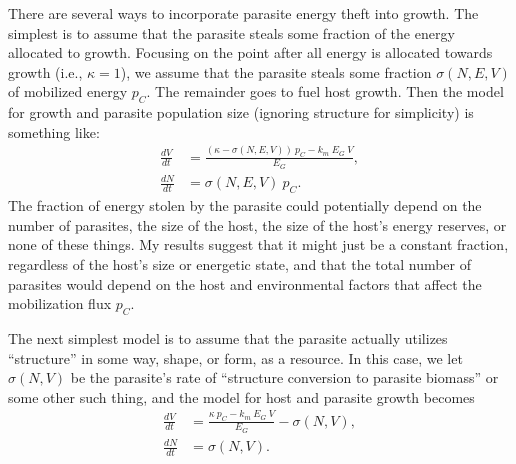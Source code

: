 \documentclass[11pt,reqno,final,pdftex]{amsart}\usepackage[]{graphicx}\usepackage[]{color}
\theoremstyle{plain}
\numberwithin{equation}{part}
\begin{document}
There are several ways to incorporate parasite energy theft into growth.
The simplest is to assume that the parasite steals some fraction of the energy allocated to growth.
Focusing on the point after all energy is allocated towards growth (i.e., $\kappa=1$), we assume that the parasite steals some fraction $\sigma(N,E,V)$ of mobilized energy $p_C$. The remainder goes to fuel host growth. Then the model for growth and parasite population size (ignoring structure for simplicity) is something like:
\begin{align}
\frac{dV}{dt} &= \frac{(\kappa-\sigma(N,E,V))~p_C - k_m~E_G~V}{E_G}, \\
\frac{dN}{dt} &= \sigma(N,E,V)~p_C.
\end{align}
The fraction of energy stolen by the parasite could potentially depend on the number of parasites, the size of the host, the size of the host's energy reserves, or none of these things.
My results suggest that it might just be a constant fraction, regardless of the host's size or energetic state, and that the total number of parasites would depend on the host and environmental factors that affect the mobilization flux $p_C$.

The next simplest model is to assume that the parasite actually utilizes ``structure'' in some way, shape, or form, as a resource.
In this case, we let $\sigma(N,V)$ be the parasite's rate of ``structure conversion to parasite biomass'' or some other such thing, and the model for host and parasite growth becomes
\begin{align}
\frac{dV}{dt} &= \frac{\kappa~p_C - k_m~E_G~V }{E_G} - \sigma(N,V), \\
\frac{dN}{dt} &= \sigma(N,V).
\end{align}
\end{document}
